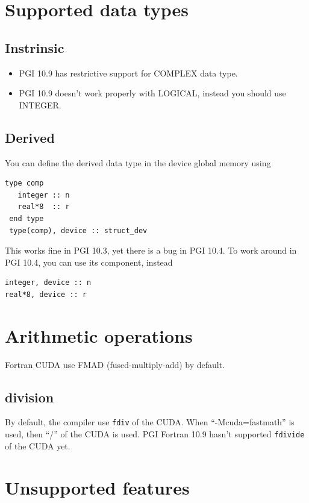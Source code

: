 \section{Supported data types}
\label{sec:supported-data-types}

\subsection{Instrinsic}
\label{sec:instrinsic}

\begin{itemize}
\item PGI 10.9 has restrictive support for COMPLEX data type.
\item PGI 10.9 doesn't work properly with LOGICAL, instead you should
  use INTEGER. 
\end{itemize}


\subsection{Derived}
\label{sec:derived-data-types}

You can define the derived data type in the device global memory using
\begin{lstlisting}
type comp
   integer :: n
   real*8  :: r
 end type
 type(comp), device :: struct_dev 
\end{lstlisting}
This works fine in PGI 10.3, yet there is a bug in PGI 10.4. To work
around in PGI 10.4, you can use its component, instead
\begin{lstlisting}
integer, device :: n
real*8, device :: r
\end{lstlisting}

\section{Arithmetic operations}
\label{sec:arithm-oper}

Fortran CUDA use FMAD (fused-multiply-add) by default.


\subsection{division}
\label{sec:division-1}

By default, the compiler use \verb!fdiv! of the CUDA. When
``-Mcuda=fastmath'' is used, then ``/'' of the CUDA is used.  PGI
Fortran 10.9 hasn't supported \verb!fdivide! of the CUDA yet.


\section{Unsupported features}
\label{sec:unsupported-features}

